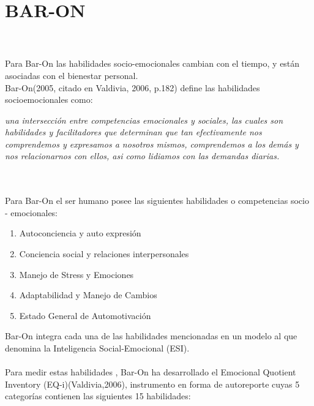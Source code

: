 \section{BAR-ON}
\\\\Para Bar-On las habilidades socio-emocionales cambian con el tiempo, y están asociadas con el bienestar personal.\\
Bar-On(2005, citado en Valdivia, 2006, p.182) define las habilidades socioemocionales como:
\begin{caja}[]
{\it una intersección entre competencias emocionales y sociales, las cuales son habilidades y facilitadores que determinan que tan efectivamente nos comprendemos y expresamos a nosotros mismos, comprendemos a los demás y nos relacionarnos con ellos, asi como lidiamos con las demandas diarias.}%
\end{caja}\\\\
Para Bar-On el ser humano posee las siguientes habilidades o competencias socio - emocionales:\\
\begin{enumerate}[label=\itembolas{}]
\item Autoconciencia y auto expresión
\item Conciencia social y relaciones interpersonales
\item Manejo de Stress y Emociones
\item Adaptabilidad y Manejo de Cambios
\item Estado General de Automotivación
\end{enumerate}

Bar-On integra cada una de las habilidades mencionadas en un modelo al que denomina la Inteligencia Social-Emocional (ESI).\\\\

Para medir estas habilidades , Bar-On ha desarrollado el Emocional Quotient Inventory (EQ-i)(Valdivia,2006), instrumento en forma de autoreporte cuyas 5 categorías contienen las siguientes 15 habilidades:\\

